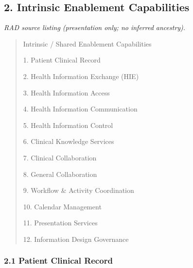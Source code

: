 \par\smallskip
{}\label{rad:ise:14}
\subsection*{2. Intrinsic Enablement Capabilities}
\label{rad:ise:16}

\textit{RAD source listing (presentation only; no inferred ancestry).}
\begin{quote}
Intrinsic / Shared Enablement Capabilities

1. Patient Clinical Record

2. Health Information Exchange (HIE)

3. Health Information Access

4. Health Information Communication

5. Health Information Control

6. Clinical Knowledge Services

7. Clinical Collaboration

8. General Collaboration

9. Workflow \& Activity Coordination

10. Calendar Management

11. Presentation Services

12. Information Design Governance
\end{quote}
\label{rad:ise:32}

\par\smallskip
{}\label{rad:ise:34}
\subsubsection*{2.1 Patient Clinical Record}
\label{rad:ise:35}

